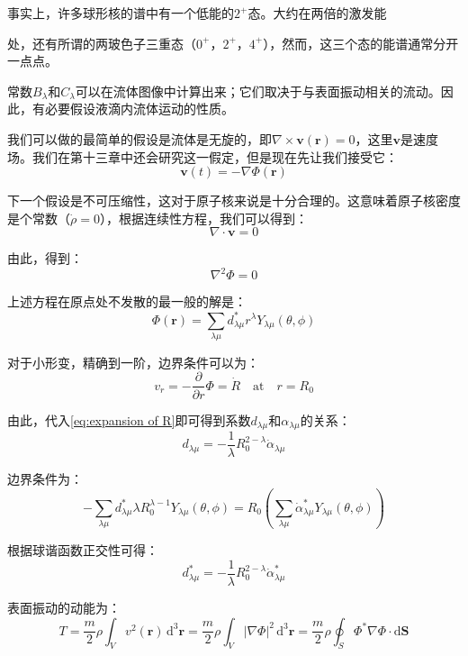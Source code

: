 事实上，许多球形核的谱中有一个低能的$2^{+}$态。大约在两倍的激发能

处，还有所谓的两玻色子三重态（$0^{+}$，$2^{+}$，$4^{+}$），然而，这三个态的能谱通常分开一点点。

常数$B_{\lambda}$和$C_{\lambda}$可以在流体图像中计算出来；它们取决于与表面振动相关的流动。因此，有必要假设液滴内流体运动的性质。

我们可以做的最简单的假设是流体是无旋的，即$\nabla\times\boldsymbol{v}(\boldsymbol{r})=0$，这里$\boldsymbol{v}$是速度场。我们在第十三章中还会研究这一假定，但是现在先让我们接受它：
\[
\boldsymbol{v}(t)=-\nabla\Phi(\boldsymbol{r})
\]

下一个假设是不可压缩性，这对于原子核来说是十分合理的。这意味着原子核密度是个常数（$\dot{\rho}=0$），根据连续性方程，我们可以得到：
\[
\nabla\cdot\boldsymbol{v}=0
\]

由此，得到：
\[
\nabla^{2}\Phi=0
\]

上述方程在原点处不发散的最一般的解是：
\[
\Phi(\boldsymbol{r})=\sum_{\lambda\mu}d^{*}_{\lambda\mu}r^{\lambda}Y_{\lambda\mu}(\theta,\phi)
\]

对于小形变，精确到一阶，边界条件可以为：
\[
v_{r}=-\frac{\partial}{\partial r}\Phi=\dot{R}\quad\text{at}\quad r=R_{0}
\]

由此，代入\ref{eq:expansion of R}即可得到系数$d_{\lambda\mu}$和$\alpha_{\lambda\mu}$的关系：
\[
d_{\lambda\mu}=-\frac{1}{\lambda}R^{2-\lambda}_{0}\dot{\alpha}_{\lambda\mu}
\]

\begin{booknote*}
边界条件为：
\[
-\sum_{\lambda\mu}d^{*}_{\lambda\mu}\lambda R^{\lambda-1}_{0}Y_{\lambda\mu}(\theta,\phi)=R_{0}\left(\sum_{\lambda\mu}\dot{\alpha}^{*}_{\lambda\mu}Y_{\lambda\mu}(\theta,\phi)\right)
\]

根据球谐函数正交性可得：
\[
d^{*}_{\lambda\mu}=-\frac{1}{\lambda}R^{2-\lambda}_{0}\dot{\alpha}^{*}_{\lambda\mu}
\]
\end{booknote*}
表面振动的动能为：
\[
T=\frac{m}{2}\rho\int_{V}v^{2}(\boldsymbol{r})\,\mathrm{d}^{3}\boldsymbol{r}=\frac{m}{2}\rho\int_{V}\left|\nabla\Phi\right|^{2}\,\mathrm{d}^{3}\boldsymbol{r}=\frac{m}{2}\rho\oint_{S}\Phi^{*}\nabla\Phi\cdot\mathrm{d}\boldsymbol{S}
\]

